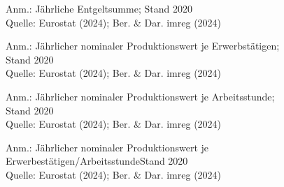 \begin{figure}[p]
	{\centering {}}
	\label{map:entgeltprostunde}
	\begin{spacing}{1} \scriptsize
		Anm.: Jährliche Entgeltsumme; Stand 2020\\
		Quelle: Eurostat (2024); Ber. \& Dar. imreg (2024) 
	\end{spacing}
\end{figure}


\begin{figure}[p]
	{\centering {}}
	\label{map:prodprokopfnom}
	\begin{spacing}{1} \scriptsize
		Anm.: Jährlicher nominaler Produktionswert je Erwerbstätigen; Stand 2020\\
		Quelle: Eurostat (2024); Ber. \& Dar. imreg (2024) 
	\end{spacing}
\end{figure}


\begin{figure}[p]
	{\centering {}}
	\label{map:prodprostundenom}
	\begin{spacing}{1} \scriptsize
		Anm.: Jährlicher nominaler Produktionswert je Arbeitsstunde; Stand 2020\\
		Quelle: Eurostat (2024); Ber. \& Dar. imreg (2024) 
	\end{spacing}
\end{figure}


\begin{figure}[p]
	{\centering {}}
	\label{map:bipvol}
	\begin{spacing}{1} \scriptsize
		Anm.: Jährlicher nominaler Produktionswert je Erwerbestätigen/ArbeitsstundeStand 2020\\
		Quelle: Eurostat (2024); Ber. \& Dar. imreg (2024) \end{spacing}
\end{figure}


